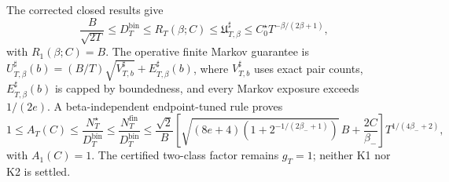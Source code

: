 The corrected closed results give \[\frac{B}{\sqrt{2T}}\le D_T^{\mathrm{bin}}\le R_T(\beta;C)\le\mathfrak U_{T,\beta}^{\sharp}\le C_0^\star T^{-\beta/(2\beta+1)},\] with \(R_1(\beta;C)=B\). The operative finite Markov guarantee is \(U_{T,\beta}^{\sharp}(b)=(B/T)\sqrt{V_{T,b}^{\sharp}}+E_{T,\beta}^{\sharp}(b)\), where \(V_{T,b}^{\sharp}\) uses exact pair counts, \(E_{T,\beta}^{\sharp}(b)\) is capped by boundedness, and every Markov exposure exceeds \(1/(2e)\). A beta-independent endpoint-tuned rule proves \[1\le A_T(C)\le\frac{N_T^\star}{D_T^{\mathrm{bin}}}\le\frac{N_T^{\mathrm{fin}}}{D_T^{\mathrm{bin}}}\le\frac{\sqrt2}{B}\left[\sqrt{(8e+4)\left(1+2^{-1/(2\beta_-+1)}\right)}\,B+\frac{2C}{\beta_-}\right]T^{1/(4\beta_-+2)},\] with \(A_1(C)=1\). The certified two-class factor remains \(g_T=1\); neither K1 nor K2 is settled.